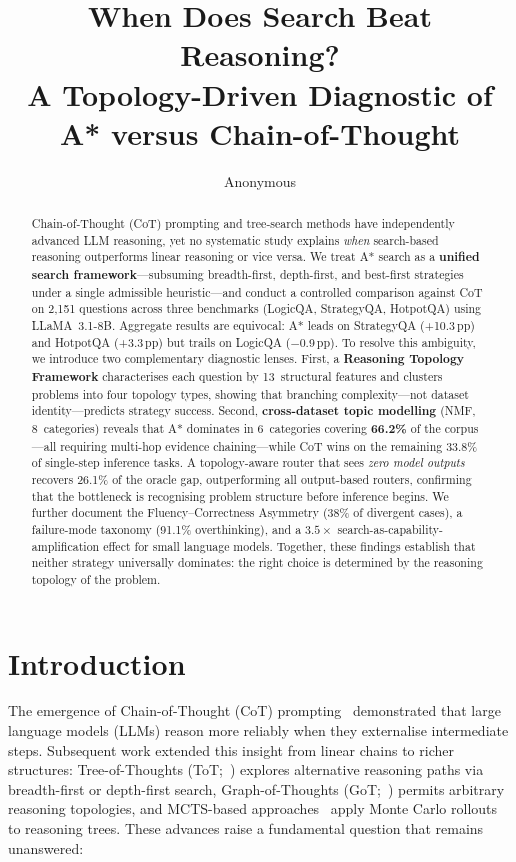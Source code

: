 \documentclass[11pt]{article}
\title{When Does Search Beat Reasoning?\\
A Topology-Driven Diagnostic of A* versus Chain-of-Thought}
\author{Anonymous}
\newcommand{\pp}{\,pp\xspace}
\begin{document}
\maketitle

\begin{abstract}
Chain-of-Thought (CoT) prompting and tree-search methods have independently
advanced LLM reasoning, yet no systematic study explains \emph{when}
search-based reasoning outperforms linear reasoning or vice versa.  We treat
A* search as a \textbf{unified search framework}---subsuming breadth-first,
depth-first, and best-first strategies under a single admissible
heuristic---and conduct a controlled comparison against CoT on 2,151 questions
across three benchmarks (LogicQA, StrategyQA, HotpotQA) using LLaMA~3.1-8B.
Aggregate results are equivocal: A* leads on StrategyQA (+10.3\pp) and
HotpotQA (+3.3\pp) but trails on LogicQA ($-$0.9\pp).  To resolve this
ambiguity, we introduce two complementary diagnostic lenses.  First, a
\textbf{Reasoning Topology Framework} characterises each question by
13~structural features and clusters problems into four topology types, showing
that branching complexity---not dataset identity---predicts strategy success.
Second, \textbf{cross-dataset topic modelling} (NMF, 8~categories) reveals
that A* dominates in 6~categories covering \textbf{66.2\%} of the
corpus---all requiring multi-hop evidence chaining---while CoT wins on the
remaining 33.8\% of single-step inference tasks.  A topology-aware router
that sees \emph{zero model outputs} recovers 26.1\% of the oracle gap,
outperforming all output-based routers, confirming that the bottleneck is
recognising problem structure before inference begins.  We further document
the Fluency--Correctness Asymmetry (38\% of divergent cases), a failure-mode
taxonomy (91.1\% overthinking), and a $3.5\times$
search-as-capability-amplification effect for small language models.
Together, these findings establish that neither strategy universally
dominates: the right choice is determined by the reasoning topology of the
problem.
\end{abstract}

\section{Introduction}
\label{sec:intro}

The emergence of Chain-of-Thought (CoT) prompting~\citep{wei2022chain}
demonstrated that large language models (LLMs) reason more reliably when they
externalise intermediate steps.  Subsequent work extended this insight from
linear chains to richer structures: Tree-of-Thoughts
(ToT;~\citealt{yao2024tree}) explores alternative reasoning paths via
breadth-first or depth-first search, Graph-of-Thoughts
(GoT;~\citealt{besta2024graph}) permits arbitrary reasoning topologies, and
MCTS-based approaches~\citep{hao2023reasoning} apply Monte Carlo rollouts to
reasoning trees.  These advances raise a fundamental question that remains
unanswered:
\end{document}

